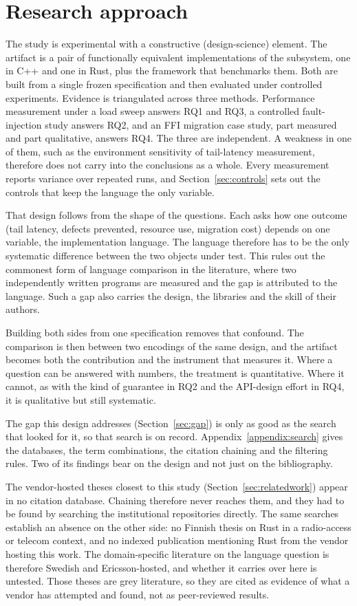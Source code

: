 \documentclass[english,twoside,openright,a4paper,censored,csm,software-track-2020]{HYthesisML}
\begin{document}
\section{Research approach}\label{sec:approach}
The study is experimental with a constructive (design-science) element. The artifact is a pair
of functionally equivalent implementations of the subsystem, one in C++ and one in Rust, plus
the framework that benchmarks them. Both are built from a single frozen specification and then
evaluated under controlled experiments. Evidence is triangulated across three methods.
Performance measurement under a load sweep answers RQ1 and RQ3, a controlled fault-injection
study answers RQ2, and an FFI migration case study, part measured and part qualitative, answers
RQ4. The three are independent. A weakness in one of them, such as the environment sensitivity
of tail-latency measurement, therefore does not carry into the conclusions as a whole. Every
measurement reports variance over repeated runs, and Section~\ref{sec:controls} sets out the
controls that keep the language the only variable.

That design follows from the shape of the questions. Each asks how one outcome (tail latency,
defects prevented, resource use, migration cost) depends on one variable, the implementation
language. The language therefore has to be the only systematic difference between the two
objects under test. This rules out the commonest form of language comparison in the literature,
where two independently written programs are measured and the gap is attributed to the language.
Such a gap also carries the design, the libraries and the skill of their authors.

Building both sides from one specification removes that confound. The comparison is then between
two encodings of the same design, and the artifact becomes both the contribution and the
instrument that measures it. Where a question can be answered with numbers, the treatment is
quantitative. Where it cannot, as with the kind of guarantee in RQ2 and the API-design effort in
RQ4, it is qualitative but still systematic.

The gap this design addresses (Section~\ref{sec:gap}) is only as good as the search that looked
for it, so that search is on record. Appendix~\ref{appendix:search} gives the databases, the term
combinations, the citation chaining and the filtering rules. Two of its findings bear on the
design and not just on the bibliography.

The vendor-hosted theses closest to this study (Section~\ref{sec:relatedwork}) appear in no
citation database. Chaining therefore never reaches them, and they had to be found by searching
the institutional repositories directly. The same searches establish an absence on the other
side: no Finnish thesis on Rust in a radio-access or telecom context, and no indexed publication
mentioning Rust from the vendor hosting this work. The domain-specific literature on the
language question is therefore Swedish and Ericsson-hosted, and whether it carries over here is
untested. Those theses are grey literature, so they are cited as evidence of what a vendor has
attempted and found, not as peer-reviewed results.
\end{document}
